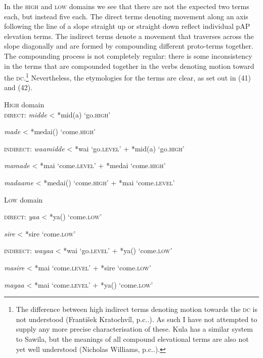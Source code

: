 In the \textsc{high} and \textsc{low} domains we see that there are not the expected two terms each, but instead five each. The direct terms denoting movement along an axis following the line of a slope straight up or straight down reflect individual pAP elevation terms. The indirect terms denote a movement that traverses across the slope diagonally and are formed by compounding different proto-terms together. The compounding process is not completely regular: there is some inconsistency in the terms that are compounded together in the verbs denoting motion toward the \textsc{dc}.\footnote{{}  The difference between high indirect terms denoting motion towards the \textsc{dc} is not understood (Franti\v{s}ek Kratochv\'il, p.c..). As such I have not attempted to supply any more precise characterisation of these. Kula has a similar system to Sawila, but the meanings of all compound elevational terms are also not yet well understood (Nicholas Williams, p.c..).} Nevertheless, the etymologies for the terms are clear, as set out in (41) and (42).



\ea%
\label{ex:41}
    \textsc{High} domain   \\

  \textsc{direct:} \textit{midde} {\textless}  *mid(a)  `go.\textsc{high'}

    \textit{made} {\textless}  *medai({\ng})  `come.\textsc{high'}

  \textsc{indirect:} \textit{waamidde} {\textless}  *wai  `go.\textsc{level'} +  *mid(a)  `go.\textsc{high'}

    \textit{mamade} {\textless}  *mai  `come.\textsc{level'} +  *medai{\ng}  `come.\textsc{high'}

    \textit{madaame} {\textless}  *medai({\ng})  `come.\textsc{high'} +  *mai  `come.\textsc{level'}

  \textsc{Low} domain

\z
\ea%
\label{ex:42}
  \textsc{direct:} \textit{yaa} {\textless}  *ya({\ng})  `come.\textsc{low'}

    \textit{sire} {\textless}  *sire  `come.\textsc{low'}

  \textsc{indirect:} \textit{wayaa} {\textless}  *wai  `go.\textsc{level'} +  *ya({\ng})  `come.\textsc{low'}

    \textit{masire} {\textless}  *mai  `come.\textsc{level'} +  *sire  `come.\textsc{low'}

    \textit{mayaa} {\textless}  *mai  `come.\textsc{level'} +  *ya({\ng})  `come.\textsc{low'}
\z


